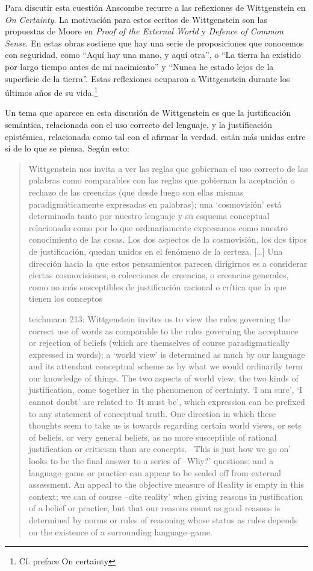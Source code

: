 Para discutir esta cuestión Anscombe recurre a las reflexiones de Wittgenstein
en \emph{On Certainty}. La motivación para estos ecritos de Wittgenstein son las
propuestas de Moore en \emph{Proof of the External World} y \emph{Defence of
  Common Sense}. En estas obras sostiene que hay una serie de proposiciones que
conocemos con seguridad, como \enquote{Aquí hay una mano, y aquí otra}, o
\enquote{La tierra ha existido por largo tiempo antes de mi nacimiento} y
\enquote{Nunca he estado lejos de la superficie de la tierra}. Estas reflexiones
ocuparon a Wittgenstein durante los últimos años de su vida.\footnote{Cf.
  preface On certainty}

Un tema que aparece en esta discusión de Wittgenstein es que la justificación
semántica, relacionada con el uso correcto del lenguaje, y la justificación
epistémica, relacionada como tal con el afirmar la verdad, están más unidas
entre sí de lo que se piensa. Según esto:\blockquote[teichmann 213: Wittgenstein
invites us to view the rules governing the correct use of words as comparable to
the rules governing the acceptance or rejection of beliefs (which are themselves
of course paradigmatically expressed in words); a ‘world view’ is determined as
much by our language and its attendant conceptual scheme as by what we would
ordinarily term our knowledge of things. The two aspects of world view, the two
kinds of justification, come together in the phenomenon of certainty. ‘I am
sure’, ‘I cannot doubt’ are related to ‘It must be’, which expression can be
prefixed to any statement of conceptual truth. One direction in which these
thoughts seem to take us is towards regarding certain world views, or sets of
beliefs, or very general beliefs, as no more susceptible of rational
justification or criticism than are concepts. –This is just how we go on’ looks
to be the final answer to a series of –Why?’ questions; and a language–game or
practice can appear to be sealed off from external assessment. An appeal to the
objective measure of Reality is empty in this context; we can of course –cite
reality’ when giving reasons in justification of a belief or practice, but that
our reasons count as good reasons is determined by norms or rules of reasoning
whose status as rules depends on the existence of a surrounding
language–game.]{Wittgenstein nos invita a ver las reglas que gobiernan el uso
  correcto de las palabras como comparables con las reglas que gobiernan la
  aceptación o rechazo de las creencias (que desde luego son ellas mismas
  paradigmáticamente expresadas en palabras); una `cosmovisión' está determinada
  tanto por nuestro lenguaje y su esquema conceptual relacionado como por lo que
  ordinariamente expresamos como nuestro conocimiento de las cosas. Los dos
  aspectos de la cosmovisión, los dos tipos de justificación, quedan unidos en
  el fenómeno de la certeza. [\ldots] Una dirección hacia la que estos
  pensamientos parecen dirigirnos es a considerar ciertas cosmovisiones, o
  colecciones de creencias, o creencias generales, como no más susceptibles de
  justificación racional o crítica que la que tienen los conceptos}.

